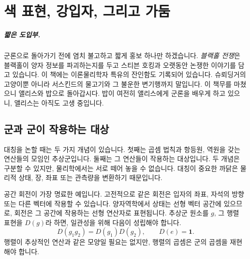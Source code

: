 \chapter{색 표현, 강입자, 그리고 가둠}

\paragraph{짧은 도입부.}
군론으로 돌아가기 전에 염치 불고하고 짧게 홍보 하나만 하겠습니다. \emph{블랙홀 전쟁}은 블랙홀이 양자 정보를 파괴하는지를 두고 스티븐 호킹과 오랫동안 논쟁한 이야기를 담고 있습니다. 이 책에는 이론물리학자 특유의 잔인함도 기록되어 있습니다. 슈뢰딩거의 고양이뿐 아니라 서스킨드의 물고기와 그 불운한 변기행까지 말입니다. 이 책무를 마쳤으니 앨리스와 밥으로 돌아갑시다. 밥이 여전히 앨리스에게 군론을 배우게 하고 있으니, 앨리스는 아직도 고생 중입니다.


\section{군과 군이 작용하는 대상}

대칭을 논할 때는 두 가지 개념이 있습니다. 첫째는 곱셈 법칙과 항등원, 역원을 갖는 연산들의 모임인 추상군입니다. 둘째는 그 연산들이 작용하는 대상입니다. 두 개념은 구분할 수 있지만, 물리학에서는 서로 떼어 놓을 수 없습니다. 대칭이 중요한 까닭은 물리적 상태, 장, 좌표 또는 관측량을 변환하기 때문입니다.

\begin{classroomqa}
\end{classroomqa}

공간 회전이 가장 명료한 예입니다. 고전적으로 같은 회전은 입자의 좌표, 자석의 방향 또는 다른 벡터에 작용할 수 있습니다. 양자역학에서 상태는 선형 벡터 공간에 있으므로, 회전은 그 공간에 작용하는 선형 연산자로 표현됩니다. 추상군 원소를 \(g\), 그 행렬 표현을 \(D(g)\)라 하면, 일관성을 위해 다음이 성립해야 합니다.
\begin{equation}
D(g_1g_2)=D(g_1)D(g_2),
\qquad
D(e)=\boldsymbol 1.
\end{equation}
행렬이 추상적인 연산과 같은 모양일 필요는 없지만, 행렬의 곱셈은 군의 곱셈을 재현해야 합니다.

